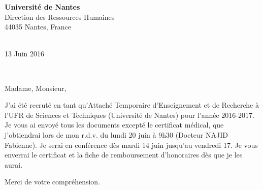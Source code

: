\documentclass[11pt,a4paper]{letter} %
\def\opening#1{\thispagestyle{empty}
{\centering\fromaddress \vspace{0.6in} \\ %
\hspace{6cm}13 Juin 2016\hspace*{\fill}\par} %
{\raggedright \toname \\ \toaddress \par} %
\vspace{0.4in} %
\noindent #1 %
}
\begin{document}

\begin{letter}
{{\bf Université de Nantes}\\
Direction des Ressources Humaines\\
44035 Nantes, France\\
}


\opening{Madame, Monsieur,}

J'ai été recruté en tant qu'Attaché Temporaire d'Enseignement et de Recherche à l'UFR de Sciences et Techniques (Université de Nantes) pour l'année 2016-2017. Je vous ai envoyé tous les documents excepté le certificat médical, que j'obtiendrai lors de mon r.d.v. du lundi 20 juin à 9h30 (Docteur NAJID Fabienne). Je serai en conférence dès mardi 14 juin jusqu'au vendredi 17. Je vous enverrai le certificat et la fiche de remboursement d'honoraires dès que je les aurai.

Merci de votre compréhension.




\end{letter}
\end{document}
